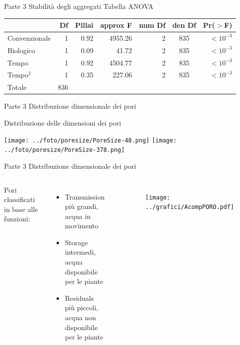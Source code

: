 \documentclass[xcolor={usenames, table, x11names}, final, 10pt]{beamer}
\begin{document}
\begin{frame}[label=Anova]{Parte 3 \small{Stabilità degli aggregati}}
  \hyperlink{finale}{}
  \footnotesize
  Tabella ANOVA 
  \begin{table}
    \centering
    \begin{tabular}{lrrrrcr}
      \toprule
      & Df&Pillai& approx F & num Df & den Df & Pr($>$F) \\ 
      \midrule
      Convenzionale & 1 & 0.92 & 4955.26  &      2 &    835 & $<10^{-3}$\\ 
      Biologico     & 1 & 0.09 & 41.72    &      2 &    835 & $<10^{-3}$\\ 
      Tempo         & 1 & 0.92 & 4504.77  &      2 &    835 & $<10^{-3}$\\ 
      Tempo$^2$     & 1 & 0.35 & 227.06   &      2 &    835 & $<10^{-3}$\\ 
      Totale        & 836 &    &          &        &        &          \\ 
      \bottomrule
    \end{tabular}
  \end{table}
\end{frame}

\begin{frame}{Parte 3 \small{Distribuzione dimensionale dei pori}}
\begin{center}
\LARGE Distribuzione delle dimensioni dei pori

\vspace{1.5cm}

    \texttt{[image: ../foto/poresize/PoreSize-48.png]}
    \texttt{[image: ../foto/poresize/PoreSize-378.png]}
\end{center}
\end{frame}


\begin{frame}[label=Porosimetria]{Parte 3 \small{Distribuzione dimensionale dei pori}}
\begin{columns}
\footnotesize{
Pori classificati in base alle funzioni:
\begin{itemize}
    \item Transmission \\ più grandi, \\acqua in movimento
    \item Storage \\ intermedi,\\ acqua disponibile per le
      piante
    \item Residuals \\ più piccoli,\\acqua non disponibile
      per le piante
\end{itemize}}
\hyperlink{finale}{}
  
  \begin{figure}
    \texttt{[image: ../grafici/AcompPORO.pdf]}
  \end{figure}

\end{columns}
\end{frame}
\end{document}
